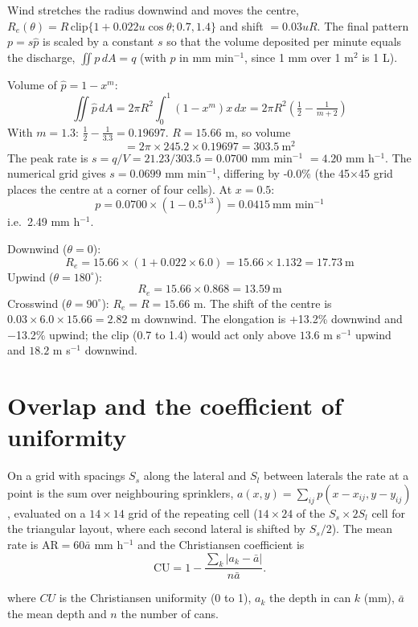 Wind stretches the radius downwind and moves the centre, $R_e(\theta)=R\,\mathrm{clip}\{1+0.022u\cos\theta;0.7,1.4\}$ and shift $=0.03uR$. The final pattern $p=s\hat p$ is scaled by a constant $s$ so that the volume deposited per minute equals the discharge, $\iint p\,dA=q$ (with $p$ in mm min$^{-1}$, since 1 mm over 1 m$^2$ is 1 L).

\sol  Volume of $\hat p=1-x^{m}$: \[\iint\hat p\,dA=2\pi R^2\int_0^1(1-x^{m})x\,dx=2\pi R^2\left(\tfrac12-\tfrac1{m+2}\right)\]
With $m=1.3$: $\tfrac12-\tfrac1{3.3}=0.19697$. $R=15.66$ m, so volume \[=2\pi\times245.2\times0.19697=303.5\ \text{m$^2$}\]
The peak rate is $s=q/V=21.23/303.5=0.0700$ mm min$^{-1}$ $=4.20$ mm h$^{-1}$. The numerical grid gives $s=0.0699$ mm min$^{-1}$, differing by -0.0\% (the 45$\times$45 grid places the centre at a corner of four cells). At $x=0.5$: \[p=0.0700\times(1-0.5^{1.3})=0.0415\ \text{mm min$^{-1}$}\]
i.e.\ 2.49 mm h$^{-1}$. \finans


\sol {}\ans Downwind ($\theta=0$): \[R_e=15.66\times(1+0.022\times6.0)=15.66\times1.132=17.73\ \text{m}\]
Upwind ($\theta=180^\circ$): \[R_e=15.66\times0.868=13.59\ \text{m}\]
Crosswind ($\theta=90^\circ$): $R_e=R=15.66$ m. The shift of the centre is $0.03\times6.0\times15.66=2.82$ m downwind. The elongation is +13.2\% downwind and $-$13.2\% upwind; the clip (0.7 to 1.4) would act only above $13.6$ m s$^{-1}$ upwind and $18.2$ m s$^{-1}$ downwind. \finans


\section{Overlap and the coefficient of uniformity}\label{ch:cu}
On a grid with spacings $S_s$ along the lateral and $S_l$ between laterals the rate at a point is the sum over neighbouring sprinklers, $a(x,y)=\sum_{ij}p(x-x_{ij},y-y_{ij})$, evaluated on a $14\times14$ grid of the repeating cell ($14\times24$ of the $S_s\times2S_l$ cell for the triangular layout, where each second lateral is shifted by $S_s/2$). The mean rate is $\mathrm{AR}=60\bar a$ mm h$^{-1}$ and the Christiansen coefficient is
\begin{equation}\boxed{\mathrm{CU}=1-\frac{\sum_k|a_k-\bar a|}{n\bar a}.}\end{equation}
\par\noindent where $CU$ is the Christiansen uniformity (0 to 1), $a_k$ the depth in can $k$ (mm), $\bar a$ the mean depth and $n$ the number of cans.

